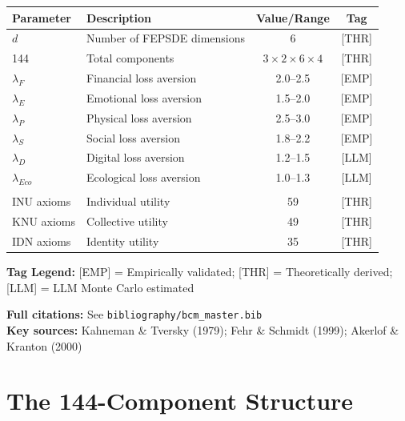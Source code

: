 \begin{tcolorbox}[colback=blue!5!white, colframe=blue!75!black,
    title=\textbf{Epistemic Status: Key Parameters}]

\renewcommand{\arraystretch}{1.3}
\begin{tabular}{@{}llcc@{}}
\toprule
\textbf{Parameter} & \textbf{Description} & \textbf{Value/Range} & \textbf{Tag} \\
\midrule
$d$ & Number of FEPSDE dimensions & 6 & [THR] \\
144 & Total components & $3 \times 2 \times 6 \times 4$ & [THR] \\
$\lambda_F$ & Financial loss aversion & 2.0--2.5 & [EMP] \\
$\lambda_E$ & Emotional loss aversion & 1.5--2.0 & [EMP] \\
$\lambda_P$ & Physical loss aversion & 2.5--3.0 & [EMP] \\
$\lambda_S$ & Social loss aversion & 1.8--2.2 & [EMP] \\
$\lambda_D$ & Digital loss aversion & 1.2--1.5 & [LLM] \\
$\lambda_{Eco}$ & Ecological loss aversion & 1.0--1.3 & [LLM] \\
\addlinespace
\multicolumn{4}{@{}l}{\textit{Axiom counts:}} \\
INU axioms & Individual utility & 59 & [THR] \\
KNU axioms & Collective utility & 49 & [THR] \\
IDN axioms & Identity utility & 35 & [THR] \\
\bottomrule
\end{tabular}

\vspace{0.5em}
\textbf{Tag Legend:} [EMP] = Empirically validated; [THR] = Theoretically derived;
[LLM] = LLM Monte Carlo estimated

\end{tcolorbox}

\noindent\textbf{Full citations:} See \texttt{bibliography/bcm\_master.bib} \\
\textbf{Key sources:} Kahneman \& Tversky (1979); Fehr \& Schmidt (1999); Akerlof \& Kranton (2000)

\vspace{1em}

\section{The 144-Component Structure}
\label{sec:app-c-structure}

